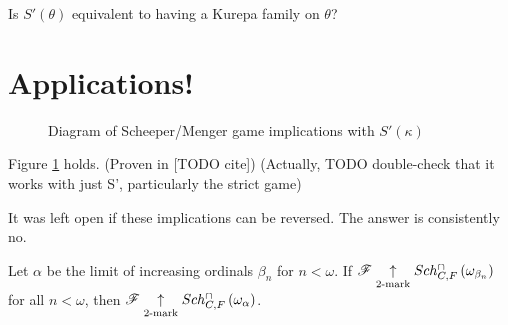 \documentclass[11pt]{article}
\begin{document}
  \begin{question}
    Is \(S'(\theta)\) equivalent to having a Kurepa family on \(\theta\)?
  \end{question}

  \section*{Applications!}

  \begin{figure}[h]
\begin{center}
\end{center}
\caption{Diagram of Scheeper/Menger game implications with \(S'(\kappa)\)}
\label{GamesDiagram2}
\end{figure}

  \begin{theorem}
    Figure \ref{GamesDiagram2} holds. (Proven in [TODO cite])
    (Actually, TODO double-check that it works with just S', particularly
    the strict game)
  \end{theorem}

  It was left open if these implications can be reversed. The answer is
  consistently no.

  \begin{theorem}
    Let \(\alpha\) be the limit of increasing ordinals \(\beta_n\) for \(n<\omega\).
    If \(\mathscr{F} \underset{2\text{-mark}}{\uparrow}Sch^{\cap}_{C,F}\left({\omega_{\beta_n}}\right)\) for all
    \(n<\omega\), then \(\mathscr{F}\underset{2\text{-mark}}{\uparrow}Sch^{\cap}_{C,F}\left({\omega_\alpha}\right)\).
  \end{theorem}
\end{document}
